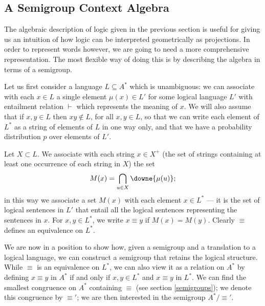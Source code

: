 \subsection{A Semigroup Context Algebra}

The algebraic description of logic given in the previous section is useful for giving us an intuition of how logic can be interpreted geometrically as projections. In order to represent words however, we are going to need a more comprehensive representation. The most flexible way of doing this is by describing the algebra in terms of a semigroup.

Let us first consider a language $L\subseteq A^*$ which is unambiguous: we can associate with each $x \in L$ a single element $\mu(x) \in L'$ for some logical language $L'$ with entailment relation $\vdash$ which represents the meaning of $x$. We will also assume that if $x,y \in L$ then $xy \notin L$, for all $x,y \in L$, so that we can write each element of $L^*$ as a string of elements of $L$ in one way only, and that we have a probability distribution $p$ over elements of $L'$.


Let $X \subset L$. We associate with each string  $x \in X^+$ (the set of strings containing at least one occurrence of each string in $X$) the set
$$M(x) = \bigcap_{u \in X} \downe{\mu(u)};$$
in this way we associate a set $M(x)$ with each element $x \in L^*$ --- it is the set of logical sentences in $L'$ that entail all the logical sentences representing the sentences in $x$. For $x,y \in L^*$, we write $x \equiv y$ if $M(x) = M(y)$. Clearly $\equiv$ defines an equivalence on $L^*$.

We are now in a position to show how, given a semigroup and a translation to a logical language, we can construct a semigroup that retains the logical structure. While $\equiv$ is an equivalence on $L^*$, we can also view it as a relation on $A^*$ by defining $x\equiv y$ in $A^*$ if and only if $x,y \in L^*$ and $x\equiv y$ in $L^*$. We can find the smallest congruence on $A^*$ containing $\equiv$ (see section \ref{semigroups}); we denote this congruence by $\equiv'$; we are then interested in the semigroup $A^* / \equiv'$.

